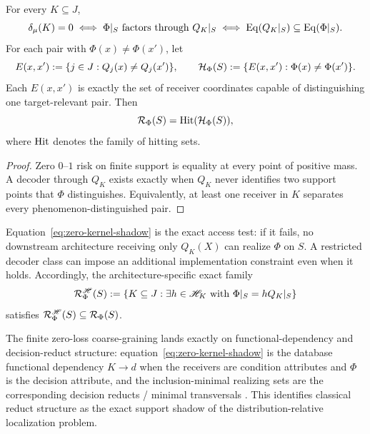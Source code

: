 \begin{proposition}
\label{thm:zero-defect-support-shadow}
\label{thm:quotient-realization-shadow}
\label{prop:discernibility-representation}
For every $K\subseteq J$,
\begin{equation}
\delta_\mu(K)=0
\iff
\Phi|_S\text{ factors through }Q_K|_S
\iff
\operatorname{Eq}(Q_K|_S)\subseteq\operatorname{Eq}(\Phi|_S).
\label{eq:zero-kernel-shadow}
\end{equation}
For each pair with $\Phi(x)\neq\Phi(x')$, let
\[
E(x,x'):=\{j\in J:Q_j(x)\neq Q_j(x')\},
\qquad
\mathcal{H}_\Phi(S):=\{E(x,x'):\Phi(x)\neq\Phi(x')\}.
\]
Each $E(x,x')$ is exactly the set of receiver coordinates capable of distinguishing one target-relevant pair. Then
\begin{equation}
\mathcal{R}_\Phi(S)=\operatorname{Hit}(\mathcal{H}_\Phi(S)),
\label{eq:hitting-shadow}
\end{equation}
where $\operatorname{Hit}$ denotes the family of hitting sets.
\end{proposition}
\begin{proof}
Zero $0$--$1$ risk on finite support is equality at every point of positive mass. A decoder through $Q_K$ exists exactly when $Q_K$ never identifies two support points that $\Phi$ distinguishes. Equivalently, at least one receiver in $K$ separates every phenomenon-distinguished pair.
\end{proof}

Equation~\eqref{eq:zero-kernel-shadow} is the exact access test: if it fails, no downstream architecture receiving only $Q_K(X)$ can realize $\Phi$ on $S$. A restricted decoder class can impose an additional implementation constraint even when it holds. Accordingly, the architecture-specific exact family
\[
\mathcal{R}^{\mathscr H}_\Phi(S)
:=
\{K\subseteq J:\exists h\in\mathscr H_K\text{ with }\Phi|_S=hQ_K|_S\}
\]
satisfies $\mathcal{R}^{\mathscr H}_\Phi(S)\subseteq\mathcal{R}_\Phi(S)$.

The finite zero-loss coarse-graining lands exactly on functional-dependency and decision-reduct structure: equation~\eqref{eq:zero-kernel-shadow} is the database functional dependency $K\to d$ when the receivers are condition attributes and $\Phi$ is the decision attribute, and the inclusion-minimal realizing sets are the corresponding decision reducts / minimal transversals \citep{skowron1992discernibility,beeri1984armstrong,demetrovics1979keys}. This identifies classical reduct structure as the exact support shadow of the distribution-relative localization problem.

